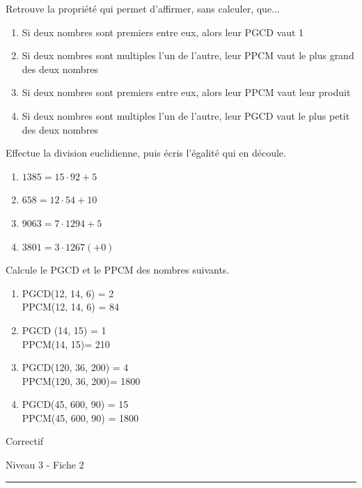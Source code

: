 \documentclass[12pt,parskip=half-, twoside=semi]{scrartcl}
\begin{document}
\begin{exercise}
  Retrouve la propriété qui permet d'affirmer, sans calculer, que... 
  \begin{enumerate}
    \item Si deux nombres sont premiers entre eux, alors leur PGCD vaut 1
    \item Si deux nombres sont multiples l'un de l'autre, leur PPCM vaut le plus grand des deux nombres
    \item Si deux nombres sont premiers entre eux, alors leur PPCM vaut leur produit
    \item Si deux nombres sont multiples l'un de l'autre, leur PGCD vaut le plus petit des deux nombres
  \end{enumerate}
\end{exercise}

\begin{exercise}
  Effectue la division euclidienne, puis écris l'égalité qui en découle.
    \begin{enumerate}[cols=2]
      \item \(1385 = 15 \cdot 92 + 5\)
      \item \(658 = 12 \cdot 54 + 10\)
      \item \(9063=7 \cdot 1294 + 5\)
      \item \(3801 = 3 \cdot 1267 (+0)\)
    \end{enumerate}
\end{exercise}

\begin{exercise}
  Calcule le PGCD et le PPCM des nombres suivants.
    \begin{enumerate}[cols=2]
      \item  PGCD(12, 14, 6) = 2 \\ PPCM(12, 14, 6) = 84 
      \item PGCD (14, 15) = 1 \\ PPCM(14, 15)= 210
      \item PGCD(120, 36, 200) = 4 \\ PPCM(120, 36, 200)= 1800
      \item PGCD(45, 600, 90) = 15 \\ PPCM(45, 600, 90) = 1800
    \end{enumerate}
\end{exercise}


\newpage

\begin{center}
  \bfseries
  \begin{Huge}
    Correctif
  \end{Huge}
  \smallbreak
  \begin{large}
    Niveau 3    - Fiche 2
  \end{large}
  \smallbreak
  \rule[10pt]{.5\linewidth}{1 pt}
\end{center}
\end{document}
